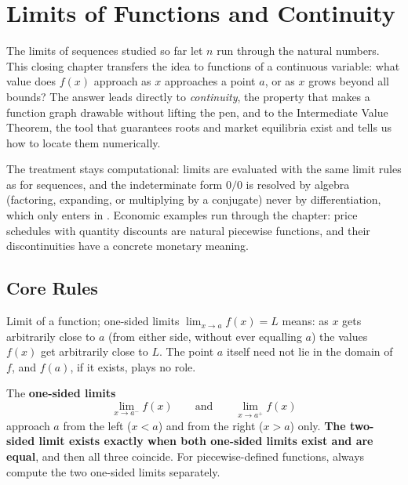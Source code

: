 \chapter{Limits of Functions and Continuity}

The limits of sequences studied so far let $n$ run through the natural
numbers. This closing chapter transfers the idea to functions of a
continuous variable: what value does $f(x)$ approach as $x$ approaches a
point $a$, or as $x$ grows beyond all bounds? The answer leads directly
to \emph{continuity}, the property that makes a function
graph drawable without lifting the pen, and to the Intermediate Value
Theorem, the tool that guarantees roots and market equilibria exist and
tells us how to locate them numerically.

The treatment stays computational: limits are evaluated with the same
limit rules as for sequences, and the indeterminate form $0/0$ is resolved
by algebra (factoring, expanding, or multiplying by a conjugate)
never by differentiation, which only enters in . Economic
examples run through the chapter: price schedules with quantity discounts
are natural piecewise functions, and their discontinuities have a concrete
monetary meaning.

\section{Core Rules}

\begin{rulebox}{Limit of a function; one-sided limits}
$\displaystyle\lim_{x\to a}f(x)=L$ means: as $x$ gets
arbitrarily close to $a$ (from either side, without ever equalling $a$) the values $f(x)$ get arbitrarily close to $L$. The point $a$ itself
need not lie in the domain of $f$, and $f(a)$, if it exists, plays no role.

The \textbf{one-sided limits}
\[
  \lim_{x\to a^{-}}f(x)
  \qquad\text{and}\qquad
  \lim_{x\to a^{+}}f(x)
\]
approach $a$ from the left ($x<a$) and from the right ($x>a$) only.
\textbf{The two-sided limit exists exactly when both one-sided limits
exist and are equal}, and then all three coincide. For piecewise-defined
functions, always compute the two one-sided limits separately.
\end{rulebox}

